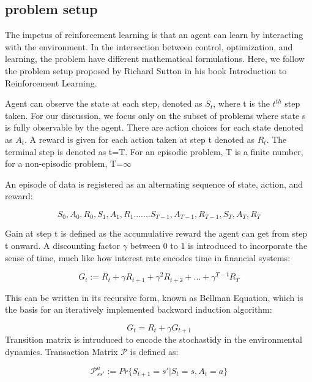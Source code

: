 \documentclass[journal]{IEEEtran}
\begin{document}
\subsection{problem setup}
The impetus of reinforcement learning is that an agent can learn by interacting with the environment. In the intersection between control, optimization, and learning, the problem have different mathematical formulations. Here, we follow the problem setup proposed by Richard Sutton in his book Introduction to Reinforcement Learning. \cite{10.5555/551283}

Agent can observe the state at each step, denoted as $ S_{t} $, where t is the $t^{th}$ step taken. For our discussion, we focus only on the subset of problems where state s is fully observable by the agent. There are action choices for each state denoted as $ A_{t} $. A reward is given for each action taken at step t denoted as $ R_{t} $. The terminal step is denoted as t=T. For an episodic problem, T is a finite number, for a non-episodic problem, T=$\infty$

An episode of data is registered as an alternating sequence of state, action, and reward:

$$ S_{0}, A_{0}, R_{0}, S_{1}, A_{1}, R_{1}.......S_{T-1},A_{T-1},R_{T-1},S_{T},A_{T},R_{T} $$

Gain at step t is defined as the accumulative reward the agent can get from step t onward. A discounting factor $\gamma$ between 0 to 1 is introduced to incorporate the sense of time, much like how interest rate encodes time in financial systems:

\begin{equation}
G_{t} := R_{t}+\gamma R_{t+1}+\gamma ^2 R_{t+2}+...+\gamma^{T-t}R_{T}
\end{equation}


This can be written in its recursive form, known as Bellman Equation, which is the basis for an iteratively implemented backward induction algorithm:

\begin{equation}
        G_{t}=R_{t}+\gamma G_{t+1}
    \label{bellman}
\end{equation}
Transition matrix is intruduced to encode the stochastidy in the environmental dynamics. Transaction Matrix $\mathcal{P}$ is defined as:

\begin{equation}
    \mathcal{P}_{ss'}^a := Pr\{S_{t+1}=s'|S_{t}=s,A_{t}=a\}
\end{equation}
\end{document}
